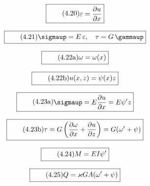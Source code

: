 \documentclass[11pt]{article}
\newcommand{\1}{ {\mathds{1}} }
\renewcommand{\epsilon}{\varepsilon}
\renewcommand{\gamma  }{\gammaup   }
\renewcommand{\sigma  }{\sigmaup   }
\begin{document}
		\begin{equation}
			\boxed{
				\tag{4.20}
				\begin{split}
					\epsilon = \frac{\partial u}{\partial x}
				\end{split}
			}
		\end{equation}

		\begin{equation}
			\boxed{
				\tag{4.21}
				\begin{split}
					\sigma= E\,\epsilon, \quad \tau = G\,\gamma
				\end{split}
			}
		\end{equation}

		\begin{equation}
			\boxed{
				\tag{4.22a}
				\begin{split}
					\omega = \omega(x)
				\end{split}
			}
		\end{equation}

		\begin{equation}
			\boxed{
				\tag{4.22b}
				\begin{split}
					u(x,z) = \psi(x)z
				\end{split}
			}
		\end{equation}
		
		\begin{equation}
			\boxed{
				\tag{4.23a}
				\begin{split}
					\sigma = E\frac{\partial u}{\partial x} = E \psi' z
				\end{split}
			}
		\end{equation}

		\begin{equation}
			\boxed{
				\tag{4.23b}
				\begin{split}
					\tau = G\left( \frac{\partial \omega}{\partial x} + \frac{\partial u}{\partial z} \right) = G (\omega' + \psi)
				\end{split}
			}
		\end{equation}

		\begin{equation}
			\boxed{
				\tag{4.24}
				\begin{split}
					M = E I \psi'
				\end{split}
			}
		\end{equation}

		\begin{equation}
			\boxed{
				\tag{4.25}
				\begin{split}
					Q = \varkappa GA(\omega' +\psi)
				\end{split}
			}
		\end{equation}
		
\end{document}

